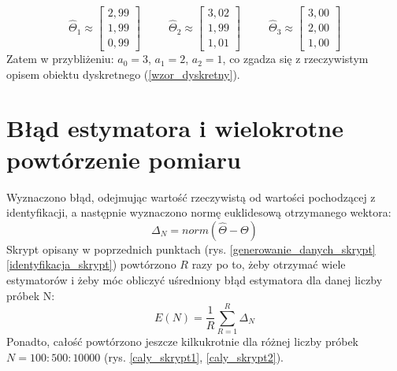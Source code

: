 \documentclass[12pt]{article}
\begin{document}
\begin{equation}
    \hat{\varTheta}_1 \approx \begin{bmatrix}
        2,99\\
        1,99\\
        0,99
    \end{bmatrix} 
    \hspace{30pt}
    \hat{\varTheta}_2 \approx \begin{bmatrix}
        3,02\\
        1,99\\
        1,01
    \end{bmatrix} 
    \hspace{30pt}
    \hat{\varTheta}_3 \approx \begin{bmatrix}
        3,00\\
        2,00\\
        1,00
    \end{bmatrix} 
\end{equation}
Zatem w przybliżeniu: $a_0 = 3$, $a_1=2$, $a_2=1$, co zgadza się z rzeczywistym opisem obiektu dyskretnego (\ref{wzor_dyskretny}).

\section{Błąd estymatora i wielokrotne powtórzenie pomiaru}
Wyznaczono błąd, odejmując wartość rzeczywistą od wartości pochodzącej z identyfikacji, a następnie wyznaczono normę euklidesową otrzymanego wektora:
\begin{equation}
    \Delta_N = norm(\hat{\varTheta} - \varTheta)
\end{equation}
Skrypt opisany w poprzednich punktach (rys. \ref{generowanie_danych_skrypt} \ref{identyfikacja_skrypt}) powtórzono $R$ razy po to, żeby otrzymać wiele estymatorów i żeby móc obliczyć uśredniony błąd estymatora dla danej liczby próbek N:
\begin{equation}
    E(N) = \frac{1}{R} \sum_{R = 1}^{R} \Delta_N  
\end{equation}
Ponadto, całość powtórzono jeszcze kilkukrotnie dla różnej liczby próbek $N = 100 : 500 : 10 000$ (rys. \ref{caly_skrypt1}, \ref{caly_skrypt2}).
\end{document}
